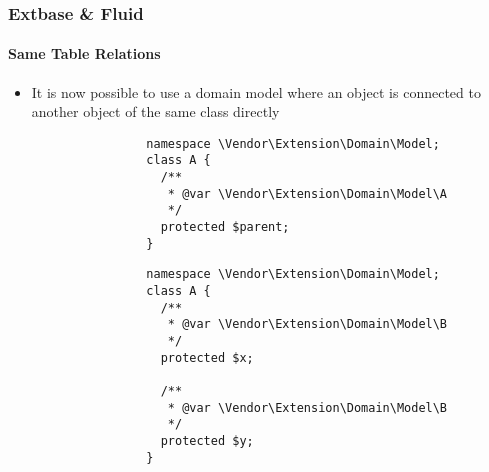 %

\begin{frame}[fragile]
	\frametitle{Extbase \& Fluid}
	\framesubtitle{Same Table Relations}

	\lstset{basicstyle=\tiny\ttfamily}

	\begin{itemize}

		\item It is now possible to use a domain model where an object is connected
			to another object of the same class directly

			\begin{lstlisting}
				namespace \Vendor\Extension\Domain\Model;
				class A {
				  /**
				   * @var \Vendor\Extension\Domain\Model\A
				   */
				  protected $parent;
				}
			\end{lstlisting}

			\begin{lstlisting}
				namespace \Vendor\Extension\Domain\Model;
				class A {
				  /**
				   * @var \Vendor\Extension\Domain\Model\B
				   */
				  protected $x;

				  /**
				   * @var \Vendor\Extension\Domain\Model\B
				   */
				  protected $y;
				}
			\end{lstlisting}

	\end{itemize}

\end{frame}


